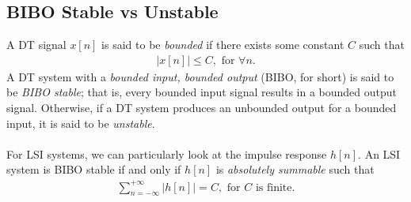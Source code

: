 \documentclass{report}
\begin{document}
\begin{center}
\end{center}

\subsection{BIBO Stable vs Unstable}
A DT signal $x[n]$ is said to be \emph{bounded} if there exists some constant $C$ such that 
\begin{align}
    |x[n]| \leq C, \text{ for } \forall n.
\end{align}
A DT system with a \emph{bounded input, bounded output} (BIBO, for short) is said to be \emph{BIBO stable}; that is, every bounded input signal results in a bounded output signal. Otherwise, if a DT system 
produces an unbounded output for a bounded input, it is said to be \emph{unstable}.
\\ \\
For LSI systems, we can particularly look at the impulse response $h[n]$. An LSI system is BIBO stable if and only if $h[n]$ is \emph{absolutely summable} such that
\begin{align}
    \sum_{n=-\infty}^{+\infty} |h[n]| = C, \text{ for $C$ is finite.}
\end{align}
\end{document}

